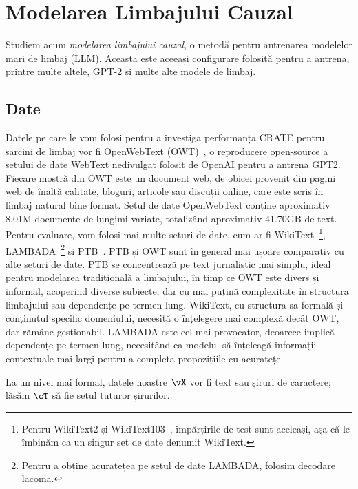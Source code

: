 \documentclass[../../book-main_ro.tex]{subfiles}
\begin{document}
\section{Modelarea Limbajului Cauzal}\label{sec:clm_text}

Studiem acum \textit{modelarea limbajului cauzal}, o metodă pentru antrenarea modelelor mari de limbaj (LLM). Aceasta este aceeași configurare folosită pentru a antrena, printre multe altele, GPT-2 și multe alte modele de limbaj.

\subsection{Date} \label{sub:clm_text_data}

Datele pe care le vom folosi pentru a investiga performanța CRATE pentru sarcini de limbaj vor fi OpenWebText (OWT)~\cite{Gokaslan2019OpenWeb}, o reproducere open-source a setului de date WebText nedivulgat folosit de OpenAI pentru a antrena GPT2. Fiecare mostră din OWT este un document web, de obicei provenit din pagini web de înaltă calitate, bloguri, articole sau discuții online, care este scris în limbaj natural bine format. Setul de date OpenWebText conține aproximativ 8.01M documente de lungimi variate, totalizând aproximativ 41.70GB de text. Pentru evaluare, vom folosi mai multe seturi de date, cum ar fi WikiText~\cite{merity2016pointer}\footnote{Pentru WikiText2 și WikiText103~\cite{merity2016pointer}, împărțirile de test sunt aceleași, așa că le îmbinăm ca un singur set de date denumit WikiText.}, LAMBADA~\cite{paperno2016lambadadatasetwordprediction}\footnote{Pentru a obține acuratețea pe setul de date LAMBADA, folosim decodare lacomă.} și PTB~\cite{marcus-etal-1993-building}. PTB și OWT sunt în general mai ușoare comparativ cu alte seturi de date. PTB se concentrează pe text jurnalistic mai simplu, ideal pentru modelarea tradițională a limbajului, în timp ce OWT este divers și informal, acoperind diverse subiecte, dar cu mai puțină complexitate în structura limbajului sau dependențe pe termen lung. WikiText, cu structura sa formală și conținutul specific domeniului, necesită o înțelegere mai complexă decât OWT, dar rămâne gestionabil. LAMBADA este cel mai provocator, deoarece implică dependențe pe termen lung, necesitând ca modelul să înțeleagă informații contextuale mai largi pentru a completa propozițiile cu acuratețe.

La un nivel mai formal, datele noastre \(\vX\) vor fi text sau șiruri de caractere; lăsăm \(\cT\) să fie setul tuturor șirurilor.
\end{document}
